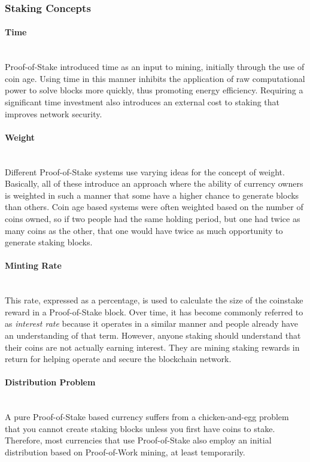 \documentclass[11pt]{article}
\begin{document}
\subsubsection{Staking Concepts}

\paragraph{Time} ~\\
Proof-of-Stake introduced time as an input to mining, initially through the use of coin age. Using time in this manner inhibits the application of raw computational power to solve blocks more quickly, thus promoting energy efficiency. Requiring a significant time investment also introduces an external cost to staking that improves network security. 

\paragraph{Weight} ~\\
Different Proof-of-Stake systems use varying ideas for the concept of weight. Basically, all of these introduce an approach where the ability of currency owners is weighted in such a manner that some have a higher chance to generate blocks than others. Coin age based systems were often weighted based on the number of coins owned, so if two people had the same holding period, but one had twice as many coins as the other, that one would have twice as much opportunity to generate staking blocks.

\paragraph{Minting Rate} ~\\
This rate, expressed as a percentage, is used to calculate the size of the coinstake reward in a Proof-of-Stake block. Over time, it has become commonly referred to as \textit{interest rate} because it operates in a similar manner and people already have an understanding of that term. However, anyone staking should understand that their coins are not actually earning interest. They are mining staking rewards in return for helping operate and secure the blockchain network.\\

\paragraph{Distribution Problem} ~\\
A pure Proof-of-Stake based currency suffers from a chicken-and-egg problem that you cannot create staking blocks unless you first have coins to stake. Therefore, most currencies that use Proof-of-Stake also employ an initial distribution based on Proof-of-Work mining, at least temporarily.\\
\end{document}
